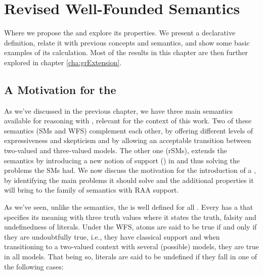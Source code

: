 \chapter{Revised Well-Founded Semantics}
\label{cha:rwfs}

\begin{ChapAbstract} 
Where we propose the \RWFS and explore its properties. We present a declarative definition, relate it with previous concepts and semantics, and show some basic examples of its calculation. Most of the results in this chapter are then further explored in chapter \ref{cha:grExtension}.
\end{ChapAbstract}





\section{A Motivation for the \RWFS} 
\label{sec:motivRWFS}
As we've discussed in the previous chapter, we have three main semantics available for reasoning with \nlps, relevant for the context of this work. Two of these semantics (SMs and WFS) complement each other, by offering different levels of expressiveness and skepticism and by allowing an acceptable transition between two-valued and three-valued models. The other one (rSMs), extends the \sms semantics by introducing a new notion of support (\raa) in \nlps and thus solving the problems the SMs had. We now discuss the motivation for the introduction of a \rwfs, by identifying the main problems it should solve and the additional properties it will bring to the family of semantics with RAA support.

As we've seen, unlike the \sms semantics, the \wfs is well defined for all \nlps. Every \nlp has a \wfm that specifies its meaning with three truth values where it states the truth, falsity and undefinedness of literals. Under the WFS, atoms are said to be true if and only if they are undoubtfully true, i.e., they have classical support and when transitioning to a two-valued context with several (possible) models, they are true in all models. That being so, literals are said to be undefined if they fall in one of the following cases:

